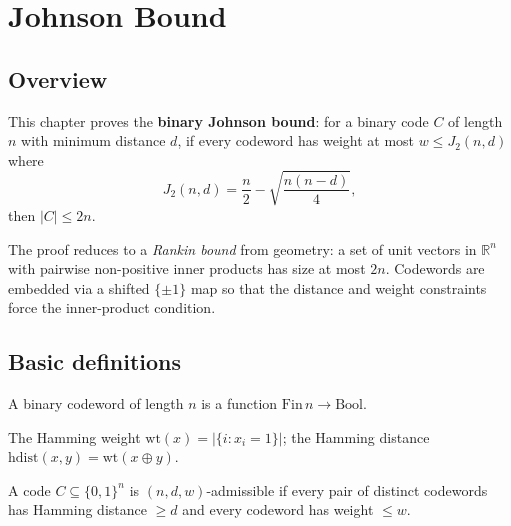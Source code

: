 \chapter{Johnson Bound}
\section{Overview}

This chapter proves the \textbf{binary Johnson bound}: for a binary code $C$
of length $n$ with minimum distance $d$, if every codeword has weight at most
$w \le J_2(n,d)$ where
\[
J_2(n,d) = \frac{n}{2} - \sqrt{\frac{n(n-d)}{4}},
\]
then $|C| \le 2n$.

The proof reduces to a \emph{Rankin bound} from geometry: a set of unit
vectors in $\mathbb{R}^n$ with pairwise non-positive inner products has
size at most $2n$.  Codewords are embedded via a shifted $\{\pm1\}$ map so
that the distance and weight constraints force the inner-product condition.

\section{Basic definitions}

\begin{definition}
\leanok
A binary codeword of length $n$ is a function $\mathrm{Fin}\,n \to \mathrm{Bool}$.
\end{definition}

\begin{definition}
\leanok
The Hamming weight $\mathrm{wt}(x) = |\{i : x_i = 1\}|$; the Hamming distance
$\mathrm{hdist}(x,y) = \mathrm{wt}(x \oplus y)$.
\end{definition}

\begin{definition}
\leanok
{}
A code $C \subseteq \{0,1\}^n$ is $(n,d,w)$-admissible if every pair of distinct
codewords has Hamming distance $\ge d$ and every codeword has weight $\le w$.
\end{definition}

